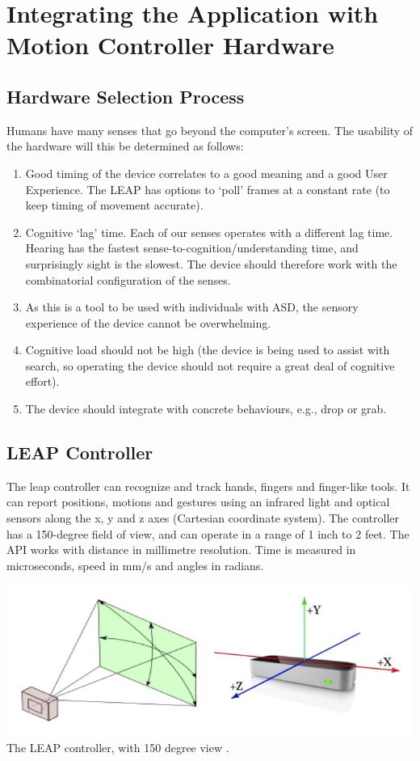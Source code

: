 \documentclass[10pt]{article}
\begin{document}
\section{Integrating the Application with Motion Controller Hardware }\label{hardware}
\subsection{Hardware Selection Process}
Humans have many senses that go beyond the computer's screen. The usability of the hardware will this be determined as follows: 
\begin{enumerate}
\item Good timing of the device correlates to a good meaning and a good User Experience. The LEAP has options to ‘poll’ frames at a constant rate (to keep timing of movement accurate).
\item Cognitive ‘lag’ time. Each of our senses operates with a different lag time. Hearing has the fastest sense-to-cognition/understanding time, and surprisingly sight is the slowest. The device should therefore work with the combinatorial configuration of the senses.
\item As this is a tool to be used with individuals with ASD, the sensory experience of the device cannot be overwhelming.
\item Cognitive load should not be high (the device is being used to assist with search, so operating the device should not require a great deal of cognitive effort).
\item The device should integrate with concrete behaviours, e.g., drop or grab. 

\end{enumerate}

\subsection{LEAP Controller}
The leap controller can recognize and track hands, fingers and finger-like tools. It can report positions, motions and gestures using an infrared light and optical sensors along the x, y and z axes (Cartesian coordinate system). The controller has a 150-degree field of view, and can operate in a range of 1 inch to 2 feet. The API works with distance in millimetre resolution. Time is measured in microseconds, speed in mm/s and angles in radians.

\begin{center}
\includegraphics[scale=0.5]{leap}\\
The LEAP controller, with 150 degree view \cite{leap}.
\end{center}
\end{document}
